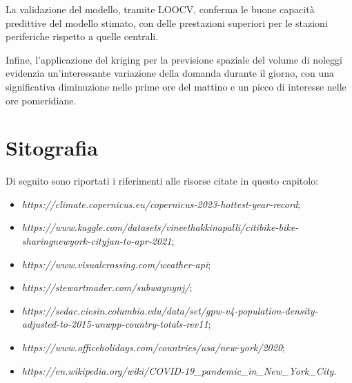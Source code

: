\par La validazione del modello, tramite LOOCV, conferma le buone capacità predittive del modello stimato, con delle prestazioni superiori per le stazioni periferiche rispetto a quelle centrali. 
\par Infine, l'applicazione del kriging per la previsione spaziale del volume di noleggi evidenzia un'interessante variazione della domanda durante il giorno, con una significativa diminuzione nelle prime ore del mattino e un picco di interesse nelle ore pomeridiane.
\section{Sitografia}
\label{sitografia_capitolo_4}
Di seguito sono riportati i riferimenti alle risorse citate in questo capitolo:
\begin{itemize}
	\item \textit{https://climate.copernicus.eu/copernicus-2023-hottest-year-record};
	\item \textit{https://www.kaggle.com/datasets/vineethakkinapalli/citibike-bike-sharingnewyork-cityjan-to-apr-2021};
	\item \textit{https://www.visualcrossing.com/weather-api};
	\item \textit{https://stewartmader.com/subwaynynj/};
	\item \textit{https://sedac.ciesin.columbia.edu/data/set/gpw-v4-population-density-adjusted-to-2015-unwpp-country-totals-rev11};
	\item \textit{https://www.officeholidays.com/countries/usa/new-york/2020};
	\item \textit{https://en.wikipedia.org/wiki/COVID-19\_pandemic\_in\_New\_York\_City}.
\end{itemize}
